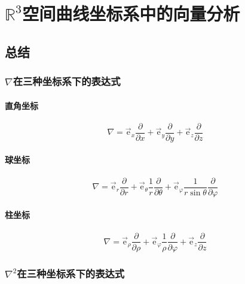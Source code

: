 
\chapter{\texorpdfstring{$\mathbb{R}^3$空间曲线坐标系中的向量分析}{R3空间曲线坐标系中的向量分析}}

\section{总结}

\subsection{\texorpdfstring{$\nabla $在三种坐标系下的表达式}{nabla在三种坐标系下的表达式}}

\subsubsection{直角坐标}

\begin{equation}
\nabla
=\vec{\mathrm{e}}_x\frac{\partial}{\partial x}+\vec{\mathrm{e}}_y\frac{\partial}{\partial y}+\vec{\mathrm{e}}_z\frac{\partial }{\partial z}
\end{equation}

\subsubsection{球坐标}

\begin{equation}
\nabla
=\vec{\mathrm{e}}_r \frac{\partial}{\partial r}+\vec{\mathrm{e}}_\theta\frac{1}{r}\frac{\partial}{\partial \theta}+\vec{\mathrm{e}}_\varphi\frac{1}{r\sin\theta}\frac{\partial }{\partial\varphi}
\end{equation}

\subsubsection{柱坐标}

\begin{equation}
\nabla
=\vec{\mathrm{e}}_\rho\frac{\partial}{\partial \rho}+\vec{\mathrm{e}}_\varphi \frac{1}{\rho} \frac{\partial}{\partial \varphi}+\vec{\mathrm{e}}_z\frac{\partial}{\partial z}
\end{equation}

\subsection{\texorpdfstring{$\nabla^2 $在三种坐标系下的表达式}{nabla2在三种坐标系下的表达式}}

